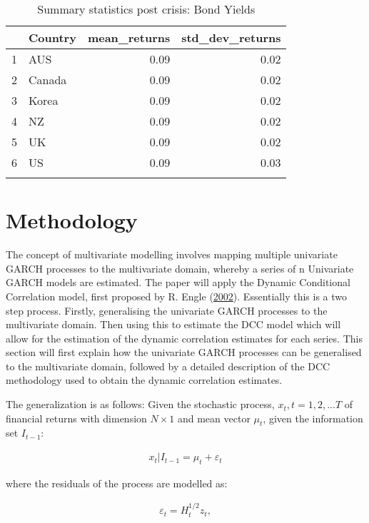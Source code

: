 \documentclass[11pt,preprint, authoryear]{elsarticle}
\numberwithin{equation}{section}
\numberwithin{figure}{section}
\numberwithin{table}{section}
\begin{document}
\begin{longtable}{rlrr}
  \hline
 & Country & mean\_returns & std\_dev\_returns \\ 
  \hline
1 & AUS & 0.09 & 0.02 \\ 
  2 & Canada & 0.09 & 0.02 \\ 
  3 & Korea & 0.09 & 0.02 \\ 
  4 & NZ & 0.09 & 0.02 \\ 
  5 & UK & 0.09 & 0.02 \\ 
  6 & US & 0.09 & 0.03 \\ 
   \hline
\hline
\caption{Summary statistics post crisis: Bond Yields \label{tablestats2}} 
\end{longtable}

\section{\texorpdfstring{Methodology
\label{methodology}}{Methodology }}\label{methodology}

The concept of multivariate modelling involves mapping multiple
univariate GARCH processes to the multivariate domain, whereby a series
of n Univariate GARCH models are estimated. The paper will apply the
Dynamic Conditional Correlation model, first proposed by R. Engle
(\protect\hyperlink{ref-engle2002dynamic}{2002}). Essentially this is a
two step process. Firstly, generalising the univariate GARCH processes
to the multivariate domain. Then using this to estimate the DCC model
which will allow for the estimation of the dynamic correlation estimates
for each series. This section will first explain how the univariate
GARCH processes can be generalised to the multivariate domain, followed
by a detailed description of the DCC methodology used to obtain the
dynamic correlation estimates.

The generalization is as follows: Given the stochastic process,
\(x_t, t=1,2,...T\) of financial returns with dimension \(N \times 1\)
and mean vector \(\mu_t\), given the information set \(I_{t-1}\):

\begin{align} \label{eq:mgarch1}
x_t \left| I_{t - 1} \right. = \mu_t + \varepsilon_t
\end{align}

where the residuals of the process are modelled as:

\begin{align} \label{eq:mgarch2}
\varepsilon_t = H_{t}^{1/2}z_t, 
\end{align}
\end{document}
